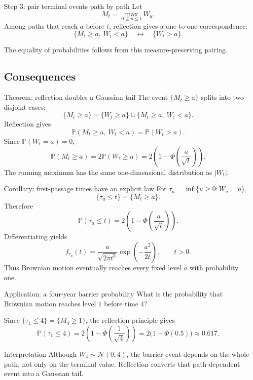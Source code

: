 \documentclass[10pt,aspectratio=169]{beamer}
\newcommand{\Pp}{\mathbb P}
\begin{document}
\begin{frame}{Step 3: pair terminal events path by path}
Let
\[
M_t=\max_{0\le u\le t}W_u.
\]
Among paths that reach \(a\) before \(t\), reflection gives a one-to-one correspondence:
\[
\{M_t\ge a,\ W_t<a\}
\quad\longleftrightarrow\quad
\{W_t>a\}.
\]
\begin{center}
\end{center}
The equality of probabilities follows from this measure-preserving pairing.
\end{frame}

\subsection{Consequences}

\begin{frame}{Theorem: reflection doubles a Gaussian tail}
The event \(\{M_t\ge a\}\) splits into two disjoint cases:
\[
\{M_t\ge a\}
=\{W_t\ge a\}
\cup
\{M_t\ge a,\ W_t<a\}.
\]
Reflection gives
\[
\Pp(M_t\ge a,\ W_t<a)=\Pp(W_t>a).
\]
Since \(\Pp(W_t=a)=0\),
\[
\boxed{\Pp(M_t\ge a)=2\Pp(W_t\ge a)}
=2\left(1-\Phi\!\left(\frac{a}{\sqrt t}\right)\right).
\]
The running maximum has the same one-dimensional distribution as \(|W_t|\).
\end{frame}

\begin{frame}{Corollary: first-passage times have an explicit law}
For \(\tau_a=\inf\{u\ge0:W_u=a\}\),
\[
\{\tau_a\le t\}=\{M_t\ge a\}.
\]
Therefore
\[
\boxed{\Pp(\tau_a\le t)
=2\left(1-\Phi\!\left(\frac{a}{\sqrt t}\right)\right)}.
\]
Differentiating yields
\[
f_{\tau_a}(t)
=\frac{a}{\sqrt{2\pi t^3}}
\exp\!\left(-\frac{a^2}{2t}\right),
\qquad t>0.
\]
Thus Brownian motion eventually reaches every fixed level \(a\) with probability one.
\end{frame}

\begin{frame}{Application: a four-year barrier probability}
What is the probability that Brownian motion reaches level \(1\) before time \(4\)?

Since \(\{\tau_1\le4\}=\{M_4\ge1\}\), the reflection principle gives
\[
\Pp(\tau_1\le4)
=2\left(1-\Phi\!\left(\frac{1}{\sqrt4}\right)\right)
=2\bigl(1-\Phi(0.5)\bigr)
\approx0.617.
\]

\begin{block}{Interpretation}
Although \(W_4\sim\mathcal N(0,4)\), the barrier event depends on the whole path, not only on the terminal value. Reflection converts that path-dependent event into a Gaussian tail.
\end{block}
\end{frame}
\end{document}
